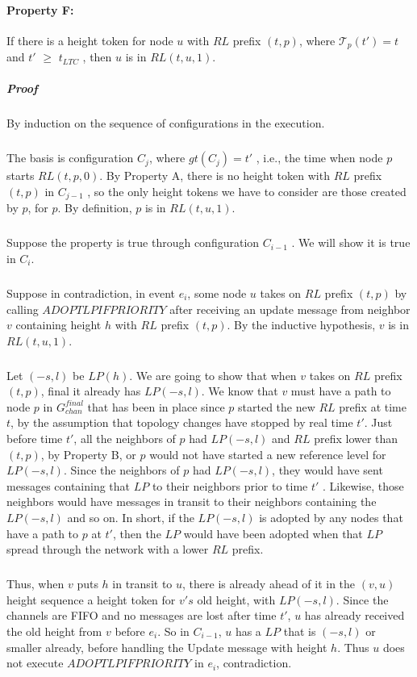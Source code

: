 \paragraph{Property F:} If there is a height token for node $u$ with $RL$ prefix $(t, p)$, where $\mathcal{T}_p(t') = t$ and $t'$ $\geq$ $t_{LTC}$ , then $u$ is in $RL (t, u, 1)$.
\subparagraph{Proof} By induction on the sequence of configurations in the execution.
\subparagraph{}The basis is configuration $C_j$, where $gt(C_j ) = t '$ , i.e., the time when node $p$ starts $RL (t, p, 0)$. By Property A, there is no height token with $RL$ prefix $(t, p)$ in $C_{j-1}$ , so the only height tokens we have to consider are those created by $p$, for $p$. By definition, $p$ is in $RL (t, u, 1)$.
\subparagraph{}Suppose the property is true through configuration $C_{i-1}$ . We will show it is true in $C_i$.
\subparagraph{}Suppose in contradiction, in event $e_i$, some node $u$ takes on $RL$ prefix $(t, p)$ by calling $ADOPTLPIFPRIORITY$ after receiving an update message from neighbor $v$ containing height $h$ with $RL$ prefix $(t, p)$. By the inductive hypothesis, $v$ is in $RL (t, u, 1)$.
\subparagraph{}Let $(-s, l)$ be $LP(h)$. We are going to show that when $v$ takes on $RL$ prefix $(t, p)$, final it already has $LP (-s, l)$. We know that $v$ must have a path to node $p$ in $G_{chan} ^{final}$ that has been in place since $p$ started the new $RL$ prefix at time $t$, by the assumption that topology changes have stopped by real time $t'$. Just before time $t'$, all the neighbors of $p$ had $LP (-s, l)$ and $RL$ prefix lower than $(t, p)$, by Property B, or $p$ would not have started a new reference level for $LP (-s, l)$. Since the neighbors of $p$ had $LP (-s, l)$, they would have sent messages containing that $LP$ to their neighbors prior to time $t'$ . Likewise, those neighbors would have messages in transit to their neighbors containing the $LP (-s, l)$ and so on. In short, if the $LP (-s, l)$ is adopted by any nodes that have a path to $p$ at $t'$, then the $LP$ would have been adopted when that $LP$ spread through the network with a lower $RL$ prefix. 
\subparagraph{}Thus, when $v$ puts $h$ in transit to $u$, there is already ahead of it in the $(v, u)$ height sequence a height token for $v's$ old height, with $LP (-s, l)$. Since the channels are FIFO and no messages are lost after time $t'$, $u$ has already received the old height from $v$ before $e_i$. So in $C_{i-1}$, $u$ has a $LP$ that is $(-s, l)$ or smaller already, before handling the Update message with height $h$. Thus $u$ does not execute $ADOPTLPIFPRIORITY$ in $e_i$, contradiction.
